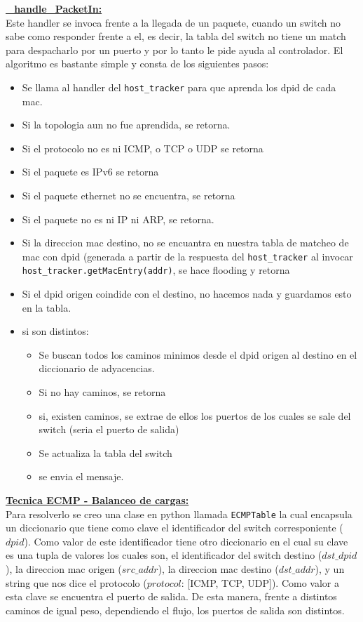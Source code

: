 	\underline{\textbf{\_handle\_PacketIn:}}\\
		Este handler se invoca frente a la llegada de un paquete, cuando un switch no sabe como responder frente a el, es decir, la 			tabla del switch no tiene un match para despacharlo por un puerto y por lo tanto le pide ayuda al controlador. El algoritmo 			es bastante simple y consta de los siguientes pasos:
		\begin{itemize}
			\item Se llama al handler del \lstinline[columns=fixed]{host_tracker} para que aprenda los dpid de cada mac.
			\item Si la topologia aun no fue aprendida, se retorna.
			\item Si el protocolo no es ni ICMP, o TCP o UDP se retorna
			\item Si el paquete es IPv6 se retorna
			\item Si el paquete ethernet no se encuentra, se retorna
			\item Si el paquete no es ni IP ni ARP, se retorna.
			\item Si la direccion mac destino, no se encuantra en nuestra tabla de matcheo de mac con dpid (generada a partir de la 			respuesta del \lstinline[columns=fixed]{host_tracker} al invocar 
			\lstinline[columns=fixed]{host_tracker.getMacEntry(addr)}, se hace flooding y retorna
			\item Si el dpid origen coindide con el destino, no hacemos nada y guardamos esto en la tabla.
			\item si son distintos:
			\begin{itemize}
				\item Se buscan todos los caminos minimos desde el dpid origen al destino en el diccionario de adyacencias.
				\item Si no hay caminos, se retorna
				\item si, existen caminos, se extrae de ellos los puertos de los cuales se sale del switch (seria el puerto de 					salida)
				\item Se actualiza la tabla del switch
				\item se envia el mensaje.
			\end{itemize}
		\end{itemize}
	\underline{\textbf{Tecnica ECMP - Balanceo de cargas:}}\\
		Para resolverlo se creo una clase en python llamada \lstinline[columns=fixed]{ECMPTable} la cual encapsula un diccionario que 			tiene como clave el identificador del switch corresponiente ($dpid$). Como valor de este identificador tiene otro diccionario 			en el cual su clave es una tupla de valores los cuales son, el identificador del switch destino ($dst\_dpid$), la direccion mac 		origen ($src\_addr$), la direccion mac destino ($dst\_addr$), y un string que nos dice el protocolo ($protocol$: [ICMP, TCP, 			UDP]). Como valor a esta clave se encuentra el puerto de salida. De esta manera, frente a distintos caminos de igual peso, 			dependiendo el flujo, los puertos de salida son distintos.

